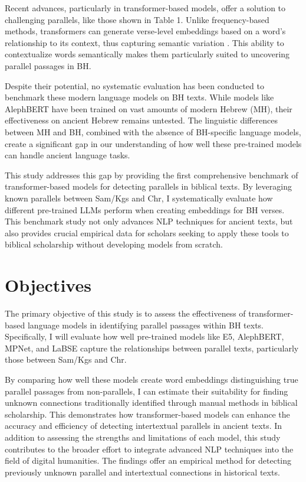 \documentclass[12pt]{article}
\begin{document}
Recent advances, particularly in transformer-based models, offer a solution to challenging parallels, like those shown in Table 1. Unlike frequency-based methods, transformers can generate verse-level embeddings based on a word's relationship to its context, thus capturing semantic variation \cite{Vaswani}. This ability to contextualize words semantically makes them particularly suited to uncovering parallel passages in BH.

Despite their potential, no systematic evaluation has been conducted to benchmark these modern language models on BH texts. While models like AlephBERT \cite{Seker} have been trained on vast amounts of modern Hebrew (MH), their effectiveness on ancient Hebrew remains untested. The linguistic differences between MH and BH, combined with the absence of BH-specific language models, create a significant gap in our understanding of how well these pre-trained models can handle ancient language tasks.

This study addresses this gap by providing the first comprehensive benchmark of transformer-based models for detecting parallels in biblical texts. By leveraging known parallels between Sam/Kgs and Chr, I systematically evaluate how different pre-trained LLMs perform when creating embeddings for BH verses. This benchmark study not only advances NLP techniques for ancient texts, but also provides crucial empirical data for scholars seeking to apply these tools to biblical scholarship without developing models from scratch.

\section{Objectives}
The primary objective of this study is to assess the effectiveness of transformer-based language models in identifying parallel passages within BH texts. Specifically, I will evaluate how well pre-trained models like E5, AlephBERT, MPNet, and LaBSE capture the relationships between parallel texts, particularly those between Sam/Kgs and Chr.

By comparing how well these models create word embeddings distinguishing true parallel passages from non-parallels, I can estimate their suitability for finding unknown connections traditionally identified through manual methods in biblical scholarship. This demonstrates how transformer-based models can enhance the accuracy and efficiency of detecting intertextual parallels in ancient texts. In addition to assessing the strengths and limitations of each model, this study contributes to the broader effort to integrate advanced NLP techniques into the field of digital humanities. The findings offer an empirical method for detecting previously unknown parallel and intertextual connections in historical texts.
\end{document}
